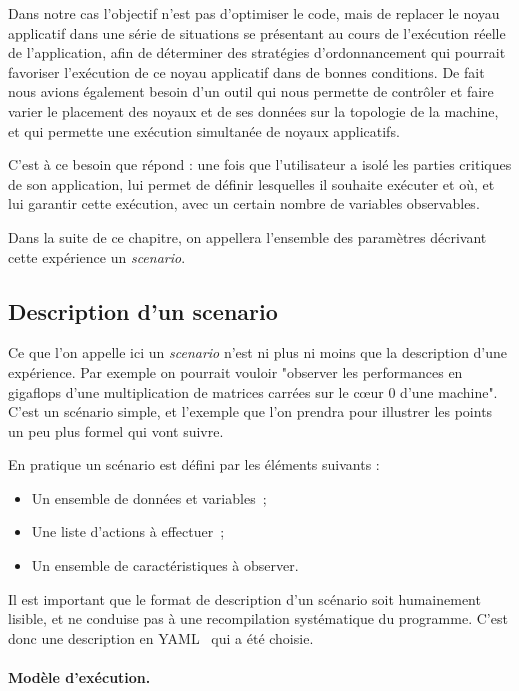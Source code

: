 Dans notre cas l'objectif n'est pas d'optimiser le code, mais de replacer le noyau applicatif dans une série de situations se présentant au cours de l'exécution réelle de l'application, afin de déterminer des stratégies d'ordonnancement qui pourrait favoriser l'exécution de ce noyau applicatif dans de bonnes conditions.
De fait nous avions également besoin d'un outil qui nous permette de contrôler et faire varier le placement des noyaux et de ses données sur la topologie de la machine, et qui permette une exécution simultanée de noyaux applicatifs.

C'est à ce besoin que répond \outil : une fois que l'utilisateur a isolé les parties critiques de son application, \outil lui permet de définir lesquelles il souhaite exécuter et où, et lui garantir cette exécution, avec un certain nombre de variables observables.

Dans la suite de ce chapitre, on appellera l'ensemble des paramètres décrivant cette expérience un \emph{scenario}.

\subsection{Description d'un scenario}

Ce que l'on appelle ici un \emph{scenario} n'est ni plus ni moins que la description d'une expérience.
Par exemple on pourrait vouloir "observer les performances en gigaflops d'une multiplication de matrices carrées sur le cœur 0 d'une machine".
C'est un scénario simple, et l'exemple que l'on prendra pour illustrer les points un peu plus formel qui vont suivre.

En pratique un scénario est défini par les éléments suivants :
\begin{itemize}
 \item Un ensemble de données et variables~;
 \item Une liste d'actions à effectuer~;
 \item Un ensemble de caractéristiques à observer.
\end{itemize}


Il est important que le format de description d'un scénario soit humainement lisible, et ne conduise pas à une recompilation systématique du programme. C'est donc une description en YAML~\cite{YAML} qui a été choisie.


\paragraph{Modèle d'exécution.}

